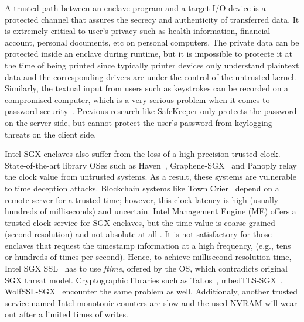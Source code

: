 A trusted path between an enclave program and a target I/O device is a protected channel that assures the secrecy and authenticity of transferred data. It is extremely critical to user's privacy such as health information, financial account, personal documents, etc on personal computers. The private data can be protected inside an enclave during runtime, but it is impossible to protecte it at the time of being printed since typically printer devices only understand plaintext data and the corresponding drivers are under the control of the untrusted kernel. Similarly, the textual input from users such as keystrokes can be recorded on a compromised computer, which is a very serious problem when it comes to password security~\cite{DBLP:conf/uss/SilverJBCJ14}. Previous research like SafeKeeper \cite{DBLP:conf/www/KrawieckaKPMA18} only protects the password on the server side, but cannot protect the user's password from keylogging threats on the client side.

Intel SGX enclaves also suffer from the loss of a high-precision trusted clock. State-of-the-art library OSes such as Haven~\cite{DBLP:journals/tocs/BaumannPH15}, Graphene-SGX~\cite{DBLP:conf/usenix/TsaiPV17} and Panoply \cite{shinde_panoply:_2017} relay the clock value from  untrusted systems. As a result, these systems are vulnerable to time deception attacks. Blockchain systems like Town Crier~\cite{DBLP:conf/ccs/ZhangCCJS16} depend on a remote server for a trusted time; however, this clock latency is high (usually hundreds of milliseconds) and uncertain. Intel Management Engine (ME) offers a trusted clock service for SGX enclaves, but the time value is coarse-grained (second-resolution) and not absolute at all \cite{intel_psw}. It is not satisfactory for those enclaves that request the timestamp information at a high frequency, (e.g., tens or hundreds of times per second). Hence, to achieve millisecond-resolution time, Intel SGX SSL~\cite{intel_sgx_ssl} has to use \textit{ftime}, offered by the OS, which contradicts original SGX threat model. Cryptographic libraries such as TaLos~\cite{TaLoS}, mbedTLS-SGX~\cite{mbedtls}, WolfSSL-SGX~\cite{wolfSSL} encounter the same problem as well. Additionaly, another trusted service named Intel monotonic counters are slow and the used NVRAM will wear out after a limited times of writes.


